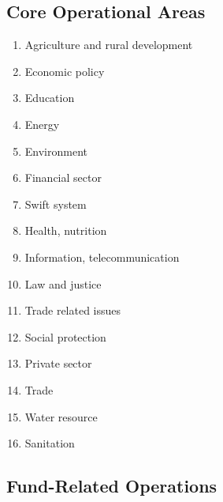 \subsection{Core Operational Areas}
\begin{enumerate}[leftmargin=*]
    \item Agriculture and rural development
    \item Economic policy
    \item Education
    \item Energy
    \item Environment
    \item Financial sector
    \item Swift system
    \item Health, nutrition
    \item Information, telecommunication
    \item Law and justice
    \item Trade related issues
    \item Social protection
    \item Private sector
    \item Trade
    \item Water resource
    \item Sanitation
\end{enumerate}

\subsection{Fund-Related Operations}

